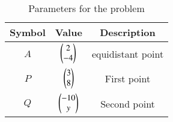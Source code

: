 \begin{table}[H]
\centering
\begin{tabular}{|c|c|c|}
\hline
\textbf{Symbol} & \textbf{Value} & \textbf{Description} \\
\hline
$A$ & $\begin{pmatrix}2 \\ -4\end{pmatrix}$ & equidistant point \\
\hline
$P$ & $\begin{pmatrix}3 \\ 8\end{pmatrix}$ & First point \\
\hline
$Q$ & $\begin{pmatrix}-10 \\ y\end{pmatrix}$ & Second point \\
\hline
\end{tabular}
\caption{Parameters for the problem}
\end{table}